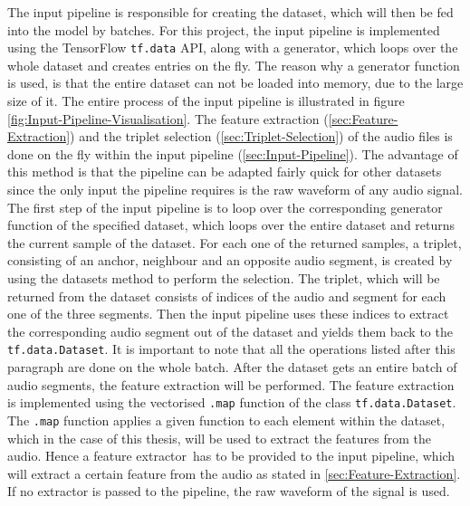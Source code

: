 \noindent
The input pipeline is responsible for creating the dataset, which will then be fed into the model by batches. For this project, the input pipeline is implemented using the TensorFlow \texttt{tf.data} API\footnotemark, along with a generator, which loops over the whole dataset and creates entries on the fly. The reason why a generator function is used, is that the entire dataset can not be loaded into memory, due to the large size of it. The entire process of the input pipeline is illustrated in figure \ref{fig:Input-Pipeline-Visualisation}.
\newline
\newline
The feature extraction (\ref{sec:Feature-Extraction}) and the triplet selection (\ref{sec:Triplet-Selection}) of the audio files is done on the fly within the input pipeline (\ref{sec:Input-Pipeline}). The advantage of this method is that the pipeline can be adapted fairly quick for other datasets since the only input the pipeline requires is the raw waveform of any audio signal.
\newline
\newline
The first step of the input pipeline is to loop over the corresponding generator function of the specified dataset, which loops over the entire dataset and returns the current sample of the dataset. For each one of the returned samples, a triplet, consisting of an anchor, neighbour and an opposite audio segment, is created by using the datasets method to perform the selection. The triplet, which will be returned from the dataset consists of indices of the audio and segment for each one of the three segments. Then the input pipeline uses these indices to extract the corresponding audio segment out of the dataset and yields them back to the \texttt{tf.data.Dataset}. It is important to note that all the operations listed after this paragraph are done on the whole batch.
\newline
\newline
After the dataset gets an entire batch of audio segments, the feature extraction will be performed. The feature extraction is implemented using the vectorised \texttt{.map} function of the class \texttt{tf.data.Dataset}\footnotemark. The \texttt{.map} function applies a given function to each element within the dataset, which in the case of this thesis, will be used to extract the features from the audio. Hence a \flqq feature extractor\frqq \ has to be provided to the input pipeline, which will extract a certain feature from the audio as stated in \ref{sec:Feature-Extraction}. If no extractor is passed to the pipeline, the raw waveform of the signal is used. 
